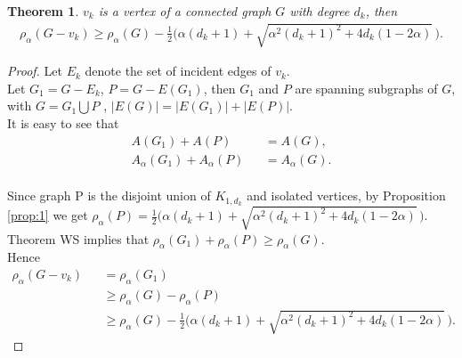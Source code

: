 \documentclass[amsthm]{elsart}
\newtheorem{theorem}{Theorem}[section]
\begin{document}
\begin{theorem} \label{the:0}
$v_k$ is a vertex of a connected graph $G$ with degree $d_k$, then
\begin{eqnarray*}
\rho _\alpha (G - v_k) \geqslant \rho _\alpha (G) - \frac{1}{2} \big( \alpha (d_k + 1) + \sqrt{\alpha ^2 (d_k + 1)^2 + 4 d_k (1-2\alpha)} \, \big).
\end{eqnarray*}
\end{theorem}
\begin{proof} Let $E_k $ denote the set of incident edges of $v_k$.
 \\ Let $G_1 = G - E_k$, $P = G - E(G_1)$,
 then $G_1$ and $P$ are spanning subgraphs of $G$, with
 $G = G_1 \bigcup P$ ,
 $|E(G)| = |E(G_1)| + |E(P)|$.
\\ It is easy to see that
\begin{eqnarray*}
 A(G_1) + A(P) \quad &&= A(G),
\\  A_\alpha (G_1) + A_\alpha (P) &&= A_\alpha (G).
\end{eqnarray*}
\\ Since graph P is the disjoint union of $K_{1,d_k}$ and isolated vertices, by Proposition \ref{prop:1} we get $\rho _\alpha (P) = \frac{1}{2} \big( \alpha (d_k + 1) + \sqrt{\alpha ^2 (d_k + 1)^2 + 4 d_k (1-2\alpha)} \, \big). $
\\ Theorem WS implies that $\rho _\alpha (G_1) + \rho _\alpha (P) \geqslant \rho _\alpha (G)$.
\\ Hence
\begin{eqnarray*}
\rho _\alpha (G - v_k) &&= \rho _\alpha (G_1)
\\ && \geqslant \rho _\alpha (G) - \rho _\alpha (P)
\\ && \geqslant \rho _\alpha (G) - \frac{1}{2} \big( \alpha (d_k + 1) + \sqrt{\alpha ^2 (d_k + 1)^2 + 4 d_k (1-2\alpha)} \, \big).
\end{eqnarray*}
\end{proof}
\end{document}
